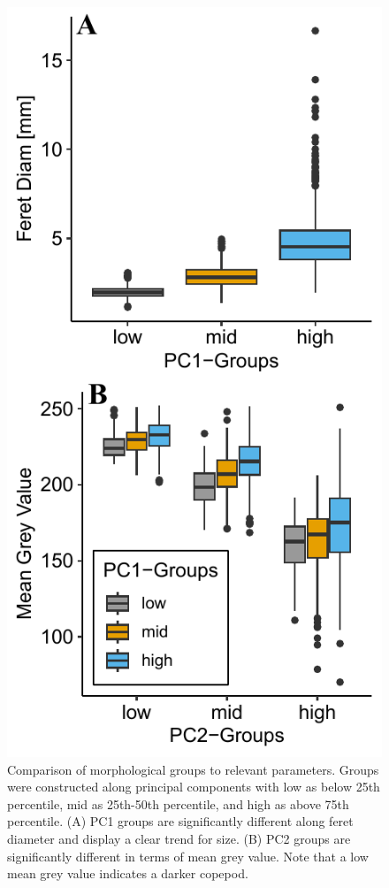 \documentclass[
]{article}
\begin{document}
\begin{figure}

{\centering \includegraphics{../media/figure_02.pdf}

}

\caption{Comparison of morphological groups to relevant parameters.
Groups were constructed along principal components with low as below
25th percentile, mid as 25th-50th percentile, and high as above 75th
percentile. (A) PC1 groups are significantly different along feret
diameter and display a clear trend for size. (B) PC2 groups are
significantly different in terms of mean grey value. Note that a low
mean grey value indicates a darker copepod.}

\end{figure}
\end{document}
